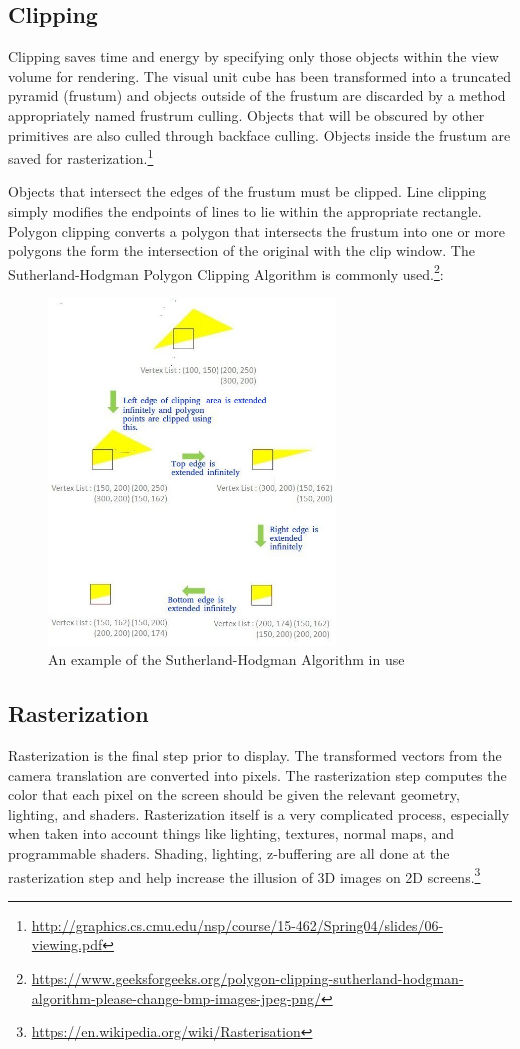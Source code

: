\documentclass{article}
\begin{document}
\subsection{Clipping}
Clipping saves time and energy by specifying only those objects within the view volume for rendering. The visual unit cube has been transformed into a truncated pyramid (frustum) and objects outside of the frustum are discarded by a method appropriately named frustrum culling. Objects that will be obscured by other primitives are also culled through backface culling. Objects inside the frustum are saved for rasterization.\footnote{\url{http://graphics.cs.cmu.edu/nsp/course/15-462/Spring04/slides/06-viewing.pdf}}

Objects that intersect the edges of the frustum must be clipped. Line clipping simply modifies the endpoints of lines to lie within the appropriate rectangle. Polygon clipping converts a polygon that intersects the frustum into one or more polygons the form the intersection of the original with the clip window. The Sutherland-Hodgman Polygon Clipping Algorithm is commonly used.\footnote{\url{https://www.geeksforgeeks.org/polygon-clipping-sutherland-hodgman-algorithm-please-change-bmp-images-jpeg-png/}}:

\begin{figure}[H]
    \centering
    \includegraphics[width=3.0in]{Sutherland-Hodgman-Example.jpg}
    \caption{An example of the Sutherland-Hodgman Algorithm in use}
    \label{Sutherland-Hodgman}
\end{figure}

\subsection{Rasterization}
Rasterization is the final step prior to display. The transformed vectors from the camera translation are converted into pixels. The rasterization step computes the color that each pixel on the screen should be given the relevant geometry, lighting, and shaders. Rasterization itself is a very complicated process, especially when taken into account things like lighting, textures, normal maps, and programmable shaders. Shading, lighting, z-buffering are all done at the rasterization step and help increase the illusion of 3D images on 2D screens.\footnote{\url{https://en.wikipedia.org/wiki/Rasterisation}}
\end{document}
